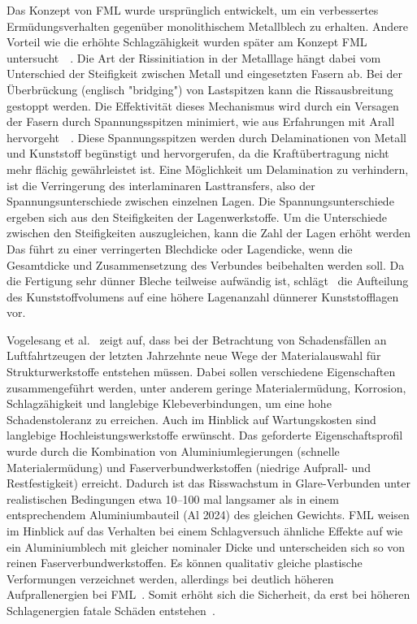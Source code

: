 Das Konzept von FML wurde ursprünglich entwickelt, um ein verbessertes Ermüdungsverhalten gegenüber monolithischem Metallblech zu erhalten.
Andere Vorteil wie die erhöhte Schlagzähigkeit wurden später am Konzept FML untersucht~\cite{Alderliesten2008}~.
Die Art der Rissinitiation in der Metalllage hängt dabei vom Unterschied der Steifigkeit zwischen Metall und eingesetzten Fasern ab.
Bei der Überbrückung (englisch "bridging") von Lastspitzen kann die Rissausbreitung gestoppt werden.
Die Effektivität dieses Mechanismus wird durch ein Versagen der Fasern durch Spannungsspitzen minimiert, wie aus Erfahrungen mit Arall hervorgeht~\cite{Marissen1988}~.
Diese Spannungsspitzen werden durch Delaminationen von Metall und Kunststoff begünstigt und hervorgerufen, da die Kraftübertragung nicht mehr flächig gewährleistet ist.
Eine Möglichkeit um Delamination zu verhindern, ist die Verringerung des interlaminaren Lasttransfers, also der Spannungsunterschiede zwischen einzelnen Lagen.
Die Spannungsunterschiede ergeben sich aus den Steifigkeiten der Lagenwerkstoffe.
Um die Unterschiede zwischen den Steifigkeiten auszugleichen, kann die Zahl der Lagen erhöht werden
Das führt zu einer verringerten Blechdicke oder Lagendicke, wenn die Gesamtdicke und Zusammensetzung des Verbundes beibehalten werden soll.
Da die Fertigung sehr dünner Bleche teilweise aufwändig ist, schlägt~\cite{Alderliesten2008} die Aufteilung des Kunststoffvolumens auf eine höhere Lagenanzahl dünnerer Kunststofflagen vor.

Vogelesang et al.~\cite{Vogelesang2000} zeigt auf, dass bei der Betrachtung von Schadensfällen an Luftfahrtzeugen der letzten Jahrzehnte neue Wege der Materialauswahl für Strukturwerkstoffe entstehen müssen.
Dabei sollen verschiedene Eigenschaften zusammengeführt werden, unter anderem geringe Materialermüdung, Korrosion, Schlagzähigkeit und langlebige Klebeverbindungen, um eine hohe Schadenstoleranz zu erreichen.
Auch im Hinblick auf Wartungskosten sind langlebige Hochleistungswerkstoffe erwünscht.
Das geforderte Eigenschaftsprofil wurde durch die Kombination von Aluminiumlegierungen (schnelle Materialermüdung) und Faserverbundwerkstoffen (niedrige Aufprall- und Restfestigkeit) erreicht.
Dadurch ist das Risswachstum in Glare-Verbunden unter realistischen Bedingungen etwa 10--100 mal langsamer als in einem entsprechendem Aluminiumbauteil (Al 2024) des gleichen Gewichts.
FML weisen im Hinblick auf das Verhalten bei einem Schlagversuch ähnliche Effekte auf wie ein Aluminiumblech mit gleicher nominaler Dicke und unterscheiden sich so von reinen Faserverbundwerkstoffen.
Es können qualitativ gleiche plastische Verformungen verzeichnet werden, allerdings bei deutlich höheren Aufprallenergien bei FML~.
Somit erhöht sich die Sicherheit, da erst bei höheren Schlagenergien fatale Schäden entstehen~\cite{Vogelesang2000}.

